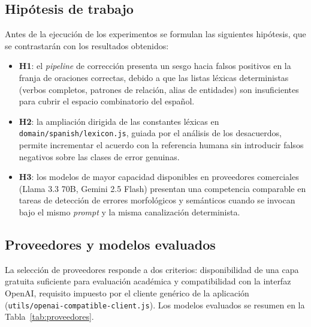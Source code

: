 \subsection{Hipótesis de trabajo}

Antes de la ejecución de los experimentos se formulan las siguientes hipótesis,
que se contrastarán con los resultados obtenidos:

\begin{itemize}
	\item \textbf{H1}: el \textit{pipeline} de corrección presenta un sesgo hacia falsos
	      positivos en la franja de oraciones correctas, debido a que las listas léxicas
	      deterministas (verbos completos, patrones de relación, alias de entidades) son
	      insuficientes para cubrir el espacio combinatorio del español.
	\item \textbf{H2}: la ampliación dirigida de las constantes léxicas en
	      \texttt{domain/spanish/lexicon.js}, guiada por el análisis de los desacuerdos,
	      permite incrementar el acuerdo con la referencia humana sin introducir falsos
	      negativos sobre las clases de error genuinas.
	\item \textbf{H3}: los modelos de mayor capacidad disponibles en proveedores
	      comerciales (Llama 3.3 70B, Gemini 2.5 Flash) presentan una competencia
	      comparable en tareas de detección de errores morfológicos y semánticos cuando
	      se invocan bajo el mismo \textit{prompt} y la misma canalización determinista.
\end{itemize}

\subsection{Proveedores y modelos evaluados}

La selección de proveedores responde a dos criterios: disponibilidad de una
capa gratuita suficiente para evaluación académica y compatibilidad con la
interfaz OpenAI, requisito impuesto por el cliente genérico de la aplicación
(\texttt{utils/\allowbreak openai-\allowbreak compatible-\allowbreak client.js}). Los modelos evaluados se resumen
en la Tabla~\ref{tab:proveedores}.

